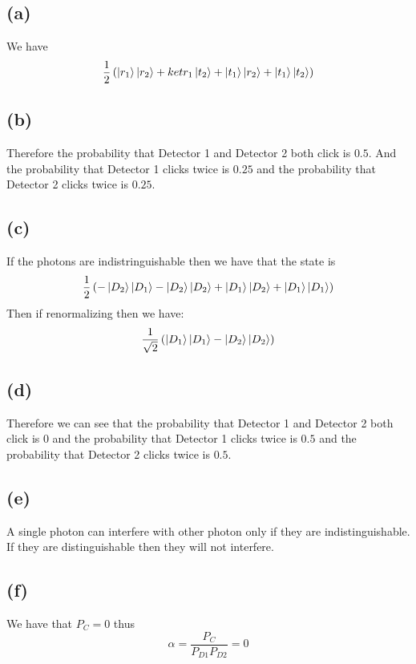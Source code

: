 \documentclass[11pt]{article}
\begin{document}
\subsection*{(a)}
We have 
$$\frac{1}{2}\left(\ket{r_1}\ket{r_2}+ket{r_1}\ket{t_2}+\ket{t_1}\ket{r_2}+\ket{t_1}\ket{t_2}\right)$$
\subsection*{(b)}
Therefore the probability that Detector 1 and Detector 2 both click is $0.5$. And the probability 
that Detector 1 clicks twice is $0.25$ and the probability that Detector 2 clicks twice is $0.25$.
\subsection*{(c)}
If the photons are indistringuishable then we have that the state is 
$$\frac{1}{2}\left(-\ket{D_2}\ket{D_1}-\ket{D_2}\ket{D_2}+\ket{D_1}\ket{D_2}+\ket{D_1}\ket{D_1}\right)$$
Then if renormalizing then we have:
$$\frac{1}{\sqrt{2}}\left(\ket{D_1}\ket{D_1}-\ket{D_2}\ket{D_2}\right)$$
\subsection*{(d)}
Therefore we can see that the probability that Detector 1 and Detector 2 both click is $0$ and the 
probability that Detector 1 clicks twice is $0.5$ and the probability that Detector 2 clicks twice is $0.5$.
\subsection*{(e)}
A single photon can interfere with other photon only if they are 
indistinguishable. If they are distinguishable then they will not interfere.
\subsection*{(f)}
We have that $P_C=0$ thus 
$$\alpha  = \frac{P_C}{P_{D1}P_{D2}} = 0$$
\end{document}
